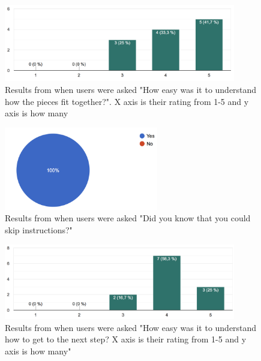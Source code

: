 \begin{figure}[hbtp]
\begin{center}
\includegraphics[width = 0.9\textwidth]{./Images/easyToUnderstand.png}
\caption{Results from when users were asked "How easy was it to understand how the pieces fit together?". X axis is their rating from 1-5 and y axis is how many}
\label{fig:question2}
\end{center}
\end{figure}

\begin{figure}[hbtp]
\begin{center}
\includegraphics[width = 0.6\textwidth]{./Images/knowToSkip.png}
\caption{Results from when users were asked "Did you know that you could skip instructions?"}
\label{fig:question3}
\end{center}
\end{figure}

\begin{figure}[hbtp]
\begin{center}
\includegraphics[width = 0.9\textwidth]{./Images/easyToUse.png}
\caption{Results from when users were asked "How easy was it to understand how to get to the next step? X axis is their rating from 1-5 and y axis is how many"}
\label{fig:question4}
\end{center}
\end{figure}

